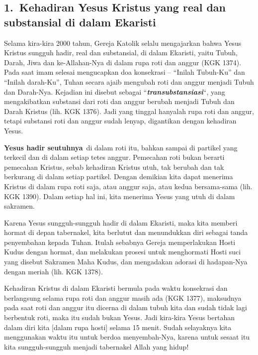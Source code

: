 \subsection[1.~Kehadiran Yesus Kristus yang real dan substansial di
dalam Ekaristi]{1.~\textbf{Kehadiran Yesus Kristus yang real dan
substansial di dalam Ekaristi}}
Selama kira-kira 2000 tahun, Gereja Katolik selalu mengajarkan bahwa
Yesus Kristus sungguh hadir, real dan substansial, di dalam Ekaristi,
yaitu Tubuh, Darah, Jiwa dan ke-Allahan-Nya di dalam rupa roti dan
anggur (KGK 1374). Pada saat imam selesai mengucapkan doa konsekrasi --
{\textquotedblleft}Inilah Tubuh-Ku{\textquotedblright} dan
{\textquotedblleft}Inilah darah-Ku{\textquotedblright}, Tuhan secara
ajaib mengubah roti dan anggur menjadi Tubuh dan Darah-Nya. Kejadian
ini disebut sebagai
{\textquotedblleft}\textbf{\emph{transubstansiasi}}{\textquotedblleft},
yang mengakibatkan substansi dari roti dan anggur berubah menjadi Tubuh
dan Darah Kristus (lih. KGK 1376). Jadi yang tinggal hanyalah rupa roti
dan anggur, tetapi substansi roti dan anggur sudah lenyap, digantikan
dengan kehadiran Yesus.

\textbf{Yesus hadir seutuhnya}~di dalam roti itu, bahkan sampai di
partikel yang terkecil dan di dalam setiap tetes anggur. Pemecahan roti
bukan berarti pemecahan Kristus, sebab kehadiran Kristus utuh, tak
berubah dan tak berkurang di dalam setiap partikel. Dengan demikian
kita dapat menerima Kristus di dalam rupa roti saja, atau anggur saja,
atau kedua bersama-sama (lih. KGK 1390). Dalam setiap hal ini, kita
menerima Yesus yang utuh di dalam sakramen.

Karena Yesus sungguh-sungguh hadir di dalam Ekaristi, maka kita memberi
hormat di depan tabernakel, kita berlutut dan menundukkan diri sebagai
tanda penyembahan kepada Tuhan. Itulah sebabnya Gereja memperlakukan
Hosti Kudus dengan hormat, dan melakukan prosesi untuk menghormati
Hosti suci yang disebut Sakramen Maha Kudus, dan mengadakan adorasi di
hadapan-Nya dengan meriah (lih. KGK 1378).

Kehadiran Kristus di dalam Ekaristi bermula pada waktu konsekrasi dan
berlangsung selama rupa roti dan anggur masih ada (KGK 1377), maksudnya
pada saat roti dan anggur itu dicerna di dalam tubuh kita dan sudah
tidak lagi berbentuk roti, maka itu sudah bukan Yesus. Jadi kira-kira
Yesus bertahan dalam diri kita [dalam rupa hosti] selama 15 menit.
Sudah selayaknya kita menggunakan waktu itu untuk berdoa menyembah-Nya,
karena untuk sesaat itu kita sungguh-sungguh menjadi tabernakel Allah
yang hidup!

